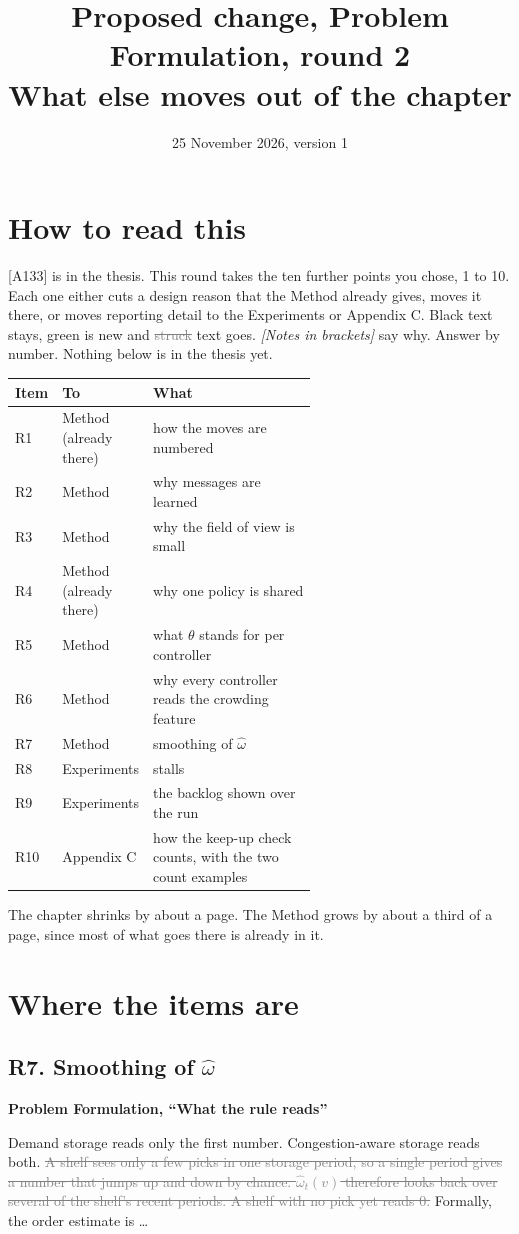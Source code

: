 \documentclass[11pt,a4paper]{article}
\title{Proposed change, Problem Formulation, round 2\\ What else moves out of the chapter}
\date{25 November 2026, version 1}
\newcommand{\new}[1]{\textcolor{newc}{#1}}
\newcommand{\old}[1]{\textcolor{gray}{\sout{#1}}}
\newcommand{\note}[1]{{\small\itshape [#1]}}
\newcommand{\where}[1]{\par\textbf{#1}\par}
\begin{document}
\sloppy
\maketitle

\section*{How to read this}
[A133] is in the thesis. This round takes the ten further points you chose,
1 to 10. Each one either cuts a design reason that the Method already gives,
moves it there, or moves reporting detail to the Experiments or Appendix C.
Black text stays, \new{green} is new and \old{struck} text goes. \note{Notes
in brackets} say why. Answer by number. Nothing below is in the thesis yet.

\begin{tabular}{@{}llp{0.6\linewidth}@{}}
\toprule
Item & To & What \\
\midrule
R1 & Method (already there) & how the moves are numbered \\
R2 & Method & why messages are learned \\
R3 & Method & why the field of view is small \\
R4 & Method (already there) & why one policy is shared \\
R5 & Method & what $\theta$ stands for per controller \\
R6 & Method & why every controller reads the crowding feature \\
R7 & Method & smoothing of $\hat\omega$ \\
R8 & Experiments & stalls \\
R9 & Experiments & the backlog shown over the run \\
R10 & Appendix C & how the keep-up check counts, with the two count examples \\
\bottomrule
\end{tabular}

The chapter shrinks by about a page. The Method grows by about a third of a
page, since most of what goes there is already in it.

\section*{Where the items are}

\subsection*{R7. Smoothing of $\hat\omega$}
\where{Problem Formulation, ``What the rule reads''}
Demand storage reads only the first number. Congestion-aware storage reads
both. \old{A shelf sees only a few picks in one storage period, so a single
period gives a number that jumps up and down by chance. $\hat\omega_t(v)$
therefore looks back over several of the shelf's recent periods. A shelf
with no pick yet reads 0.} Formally, the order estimate is \dots
\end{document}
